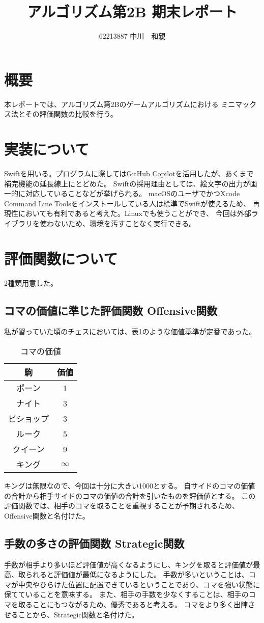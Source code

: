 \documentclass[12pt, a4paper, uplatex]{jsarticle}
\title{アルゴリズム第2B 期末レポート}
\author{62213887 中川　和親}
\begin{document}
\maketitle

\section{概要}
本レポートでは、アルゴリズム第2Bのゲームアルゴリズムにおける
ミニマックス法とその評価関数の比較を行う。

\section{実装について}
Swiftを用いる。プログラムに際してはGitHub Copilotを活用したが、あくまで補完機能の延長線上にとどめた。
Swiftの採用理由としては、絵文字の出力が画一的に対応していることなどが挙げられる。
macOSのユーザでかつXcode Command Line Toolsをインストールしている人は標準でSwiftが使えるため、
再現性においても有利であると考えた。Linuxでも使うことができ、
今回は外部ライブラリを使わないため、環境を汚すことなく実行できる。

\section{評価関数について}
2種類用意した。
\subsection{コマの価値に準じた評価関数 Offensive関数}
私が習っていた頃のチェスにおいては、表\ref*{tab:piece_value}のような価値基準が定番であった。
\begin{table}
  \centering
  \caption{コマの価値}\label{tab:piece_value}
  \begin{tabular}{|c|c|}
    \hline
    駒     & 価値       \\
    \hline
    ポーン   & 1        \\
    ナイト   & 3        \\
    ビショップ & 3        \\
    ルーク   & 5        \\
    クイーン  & 9        \\
    キング   & $\infty$ \\
    \hline
  \end{tabular}
\end{table}
キングは無限なので、今回は十分に大きい1000とする。
自サイドのコマの価値の合計から相手サイドのコマの価値の合計を引いたものを評価値とする。
この評価関数では、相手のコマを取ることを重視することが予期されるため、
Offensive関数と名付けた。

\subsection{手数の多さの評価関数 Strategic関数}
手数が相手より多いほど評価値が高くなるようにし、キングを取ると評価値が最高、取られると評価値が最低になるようにした。
手数が多いということは、コマが中央やひらけた位置に配置できているということであり、コマを強い状態に保てていることを意味する。
また、相手の手数を少なくすることは、相手のコマを取ることにもつながるため、優秀であると考える。
コマをより多く出陣させることから、Strategic関数と名付けた。
\end{document}
